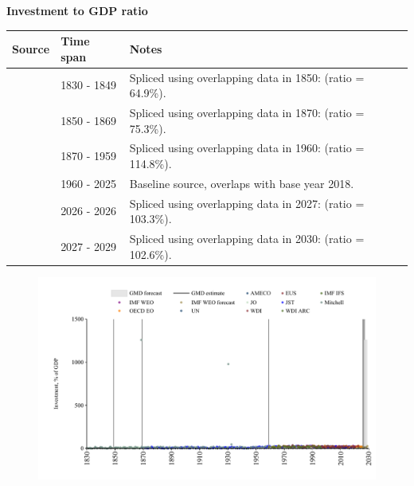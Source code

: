 \documentclass[12pt,a4paper,landscape]{article}
\begin{document}
\begin{adjustbox}{max totalsize={\paperwidth}{\paperheight},center}
\begin{minipage}[t][\textheight][t]{\textwidth}
\vspace*{0.5cm}
{}
\begin{center}
{\Large\bfseries Investment to GDP ratio}
\end{center}
\vspace{0.5cm}
\begin{table}[H]
\centering
\small
\begin{tabular}{|l|l|l|}
\hline
\textbf{Source} & \textbf{Time span} & \textbf{Notes} \\
\hline
\rowcolor{white}\cite{Mitchell}& 1830 - 1849 &Spliced using overlapping data in 1850: (ratio = 64.9\%). \\
\rowcolor{lightgray}\cite{JO}& 1850 - 1869 &Spliced using overlapping data in 1870: (ratio = 75.3\%). \\
\rowcolor{white}\cite{JST}& 1870 - 1959 &Spliced using overlapping data in 1960: (ratio = 114.8\%). \\
\rowcolor{lightgray}\cite{OECD_EO}& 1960 - 2025 &Baseline source, overlaps with base year 2018. \\
\rowcolor{white}\cite{AMECO}& 2026 - 2026 &Spliced using overlapping data in 2027: (ratio = 103.3\%). \\
\rowcolor{lightgray}\cite{IMF_WEO_forecast}& 2027 - 2029 &Spliced using overlapping data in 2030: (ratio = 102.6\%). \\
\hline
\end{tabular}
\end{table}
\begin{figure}[H]
\centering
\includegraphics[width=\textwidth,height=0.6\textheight,keepaspectratio]{graphs/GBR_inv_GDP.pdf}
\end{figure}
\end{minipage}
\end{adjustbox}
\end{document}
